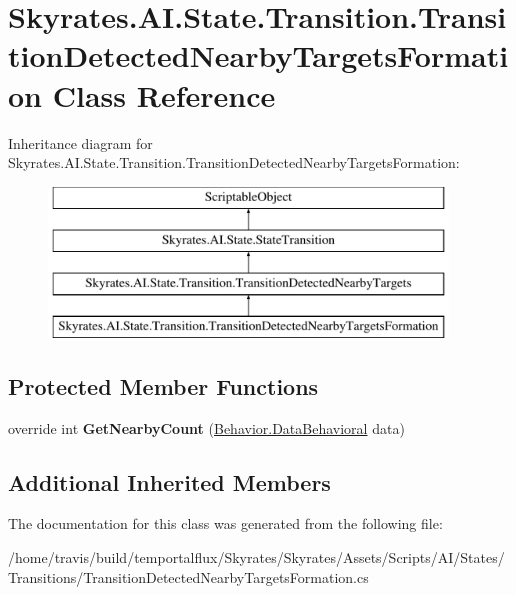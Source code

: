\hypertarget{class_skyrates_1_1_a_i_1_1_state_1_1_transition_1_1_transition_detected_nearby_targets_formation}{\section{Skyrates.\-A\-I.\-State.\-Transition.\-Transition\-Detected\-Nearby\-Targets\-Formation Class Reference}
\label{class_skyrates_1_1_a_i_1_1_state_1_1_transition_1_1_transition_detected_nearby_targets_formation}
}
Inheritance diagram for Skyrates.\-A\-I.\-State.\-Transition.\-Transition\-Detected\-Nearby\-Targets\-Formation\-:\begin{figure}[H]
\begin{center}
\leavevmode
\includegraphics[height=4.000000cm]{class_skyrates_1_1_a_i_1_1_state_1_1_transition_1_1_transition_detected_nearby_targets_formation}
\end{center}
\end{figure}
\subsection*{Protected Member Functions}
\begin{DoxyCompactItemize}
\item 
\hypertarget{class_skyrates_1_1_a_i_1_1_state_1_1_transition_1_1_transition_detected_nearby_targets_formation_a122f7e5f5ad7670bc1a0e0d588e778c6}{override int {\bfseries Get\-Nearby\-Count} (\hyperlink{class_skyrates_1_1_a_i_1_1_behavior_1_1_data_behavioral}{Behavior.\-Data\-Behavioral} data)}\label{class_skyrates_1_1_a_i_1_1_state_1_1_transition_1_1_transition_detected_nearby_targets_formation_a122f7e5f5ad7670bc1a0e0d588e778c6}

\end{DoxyCompactItemize}
\subsection*{Additional Inherited Members}


The documentation for this class was generated from the following file\-:\begin{DoxyCompactItemize}
\item 
/home/travis/build/temportalflux/\-Skyrates/\-Skyrates/\-Assets/\-Scripts/\-A\-I/\-States/\-Transitions/Transition\-Detected\-Nearby\-Targets\-Formation.\-cs\end{DoxyCompactItemize}
